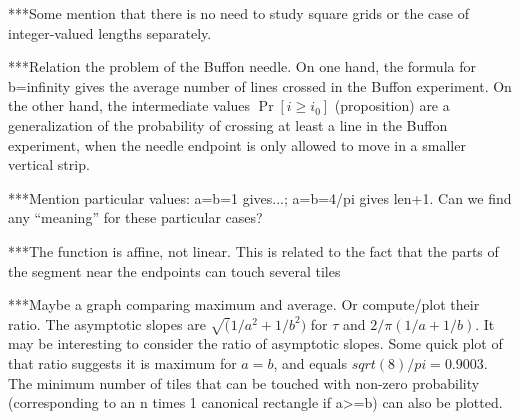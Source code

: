 \documentclass[12pt, a4paper]{article}
\newcommand{\funt}{\tau} %
\begin{document}
***Some mention that there is no need to study square grids or the case of integer-valued lengths separately.

***Relation the problem of the Buffon needle. On one hand, the formula for b=infinity gives the average number of lines crossed in the Buffon experiment. On the other hand, the intermediate values $\Pr[i \geq i_0]$ (proposition) are a generalization of the probability of crossing at least a line in the Buffon experiment, when the needle endpoint is only allowed to move in a smaller vertical strip.

***Mention particular values: a=b=1 gives...; a=b=4/pi gives len+1. Can we find any ``meaning'' for these particular cases?

***The function is affine, not linear. This is related to the fact that the parts of the segment near the endpoints can touch several tiles

***Maybe a graph comparing maximum and average. Or compute/plot their ratio. The asymptotic slopes are $\sqrt(1/a^2+1/b^2)$ for $\funt$ and $2/\pi(1/a+1/b)$. It may be interesting to consider the ratio of asymptotic slopes. Some quick plot of that ratio suggests it is maximum for $a=b$, and equals $sqrt(8)/pi = 0.9003$. The minimum number of tiles that can be touched with non-zero probability (corresponding to an n times 1 canonical rectangle if a>=b) can also be plotted.




\end{document}
